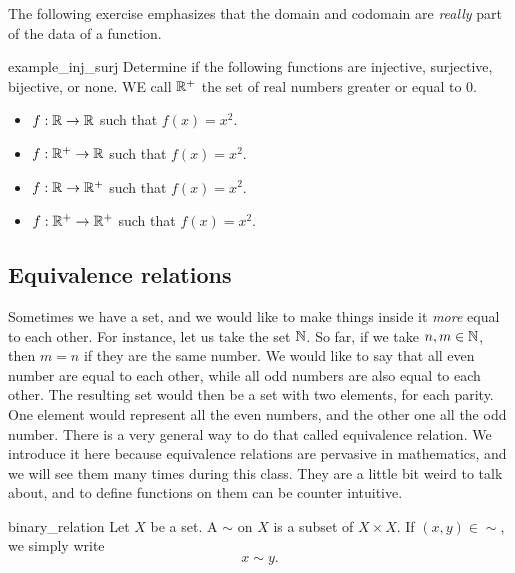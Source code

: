 The following exercise emphasizes that the domain and codomain are \textit{really} part of the data of a function.
\begin{cex}{}{example_inj_surj}
    Determine if the following functions are injective, surjective, bijective, or none. WE call \( \mathbb{R}^+ \) the set of real numbers greater or equal to \( 0 \).
    \begin{itemize}
        \item \( f : \mathbb{R} \to \mathbb{R} \) such that \( f(x) = x^2 \).
        \item \( f : \mathbb{R}^+ \to \mathbb{R} \) such that \( f(x) = x^2 \).
        \item \( f : \mathbb{R} \to \mathbb{R}^+ \) such that \( f(x) = x^2 \).
        \item \( f : \mathbb{R}^+ \to \mathbb{R}^+ \) such that \( f(x) = x^2 \).
    \end{itemize}
\end{cex}


\subsection{Equivalence relations}

Sometimes we have a set, and we would like to make things inside it \textit{more} equal to each other. For instance, let us take the set \( \mathbb{N} \). So far, if we take \( n, m \in \mathbb{N} \), then \( m = n \) if they are the same number. We would like to say that all even number are equal to each other, while all odd numbers are also equal to each other. The resulting set would then be a set with two elements, for each parity. One element would represent all the even numbers, and the other one all the odd number. There is a very general way to do that called equivalence relation. We introduce it here because equivalence relations are pervasive in mathematics, and we will see them many times during this class. They are a little bit weird to talk about, and to define functions on them can be counter intuitive. 

\begin{cdef}{}{binary_relation}
    Let \( X \) be a set. A  \( \sim \) on \( X \) is a subset of \( X \times X \). If \( (x, y) \in \sim \), we simply write
    \begin{equation*}
        x \sim y.
    \end{equation*} 
\end{cdef}

